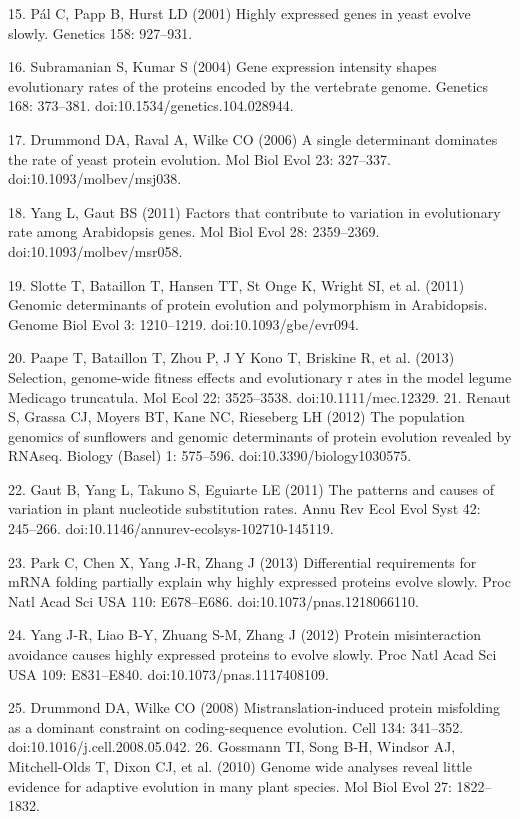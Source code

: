 15.	Pál C, Papp B, Hurst LD (2001) Highly expressed genes in yeast evolve slowly. Genetics 158: 927–931.

16.	Subramanian S, Kumar S (2004) Gene expression intensity shapes evolutionary rates of the proteins encoded by the vertebrate genome. Genetics 168: 373–381. doi:10.1534/genetics.104.028944.

17.	Drummond DA, Raval A, Wilke CO (2006) A single determinant dominates the rate of yeast protein evolution. Mol Biol Evol 23: 327–337. doi:10.1093/molbev/msj038.

18.	Yang L, Gaut BS (2011) Factors that contribute to variation in evolutionary rate among Arabidopsis genes. Mol Biol Evol 28: 2359–2369. doi:10.1093/molbev/msr058.

19.	Slotte T, Bataillon T, Hansen TT, St Onge K, Wright SI, et al. (2011) Genomic determinants of protein evolution and polymorphism in Arabidopsis. Genome Biol Evol 3: 1210–1219. doi:10.1093/gbe/evr094.

20.	Paape T, Bataillon T, Zhou P, J Y Kono T, Briskine R, et al. (2013) Selection, genome-wide fitness effects and evolutionary r
ates in the model legume Medicago truncatula. Mol Ecol 22: 3525–3538. doi:10.1111/mec.12329.
21.	Renaut S, Grassa CJ, Moyers BT, Kane NC, Rieseberg LH (2012) The population genomics of sunflowers and genomic determinants of protein evolution revealed by RNAseq. Biology (Basel) 1: 575–596. doi:10.3390/biology1030575.

22.	Gaut B, Yang L, Takuno S, Eguiarte LE (2011) The patterns and causes of variation in plant nucleotide substitution rates. Annu Rev Ecol Evol Syst 42: 245–266. doi:10.1146/annurev-ecolsys-102710-145119.

23.	Park C, Chen X, Yang J-R, Zhang J (2013) Differential requirements for mRNA folding partially explain why highly expressed proteins evolve slowly. Proc Natl Acad Sci USA 110: E678–E686. doi:10.1073/pnas.1218066110.

24.	Yang J-R, Liao B-Y, Zhuang S-M, Zhang J (2012) Protein misinteraction avoidance causes highly expressed proteins to evolve slowly. Proc Natl Acad Sci USA 109: E831–E840. doi:10.1073/pnas.1117408109.

25.	Drummond DA, Wilke CO (2008) Mistranslation-induced protein misfolding as a dominant constraint on coding-sequence evolution. Cell 134: 341–352. doi:10.1016/j.cell.2008.05.042.
26.	Gossmann TI, Song B-H, Windsor AJ, Mitchell-Olds T, Dixon CJ, et al. (2010) Genome wide analyses reveal little evidence for adaptive evolution in many plant species. Mol Biol Evol 27: 1822–1832. 

